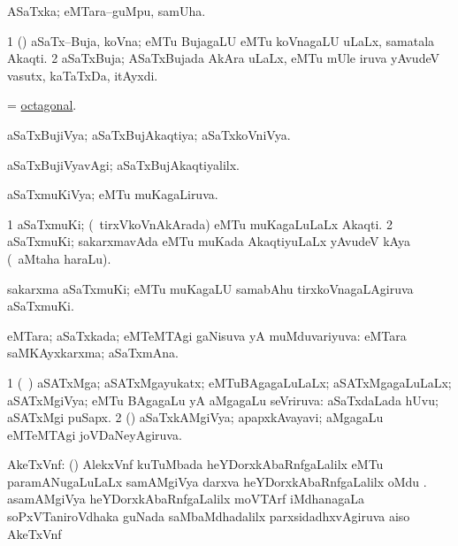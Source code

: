 \bentry
{}
\gl{\nA}
\bmng
ASaTxka; eMTara--guMpu, samUha. 
\emng
\eentry

\bentry
{}
\gl{\nA}
\bmng
\bnum
\num{1} (\jAyx) aSaTx--Buja, koVna; eMTu BujagaLU eMTu koVnagaLU uLaLx, samatala Akaqti.  
\num{2} aSaTxBuja; ASaTxBujada AkAra uLaLx, eMTu mUle iruva yAvudeV vasutx, kaTaTxDa, itAyxdi. 
\enum
\emng
\eentry

\bentry
{}
\gl{\gu}
\bmng
= \hyperlink{octagonal}{octagonal}. 
\emng
\eentry

\bentry
{}
\gl{\gu}
\bmng
aSaTxBujiVya; aSaTxBujAkaqtiya; aSaTxkoVniVya. 
\emng
\eentry

\bentry
{}
\gl{\kirxvi}
\bmng
aSaTxBujiVyavAgi; aSaTxBujAkaqtiyalilx. 
\emng
\eentry

\bentry
{}
\gl{\gu}
\bmng
aSaTxmuKiVya; eMTu muKagaLiruva. 
\emng
\eentry

\bentry
{}
\gl{\nA}
\bmng
\bnum
\num{1} aSaTxmuKi; (\kanmu\ tirxVkoVnAkArada) eMTu muKagaLuLaLx Akaqti. 
\num{2} aSaTxmuKi; sakarxmavAda eMTu muKada AkaqtiyuLaLx yAvudeV kAya (\kanmu\ aMtaha haraLu). 
\enum
\emng

\noindent
\gl{\pagu}
\bmng
{} sakarxma aSaTxmuKi; eMTu muKagaLU samabAhu tirxkoVnagaLAgiruva aSaTxmuKi. 
\emng
\eentry

\bentry
{}
\gl{\gu}
\bmng
eMTara; aSaTxkada; eMTeMTAgi gaNisuva yA muMduvariyuva:  eMTara saMKAyxkarxma; aSaTxmAna. 
\emng
\eentry

\bentry
{}
\gl{\gu}
\bmng
\bnum
\num{1} (\kanmu\ \savi) aSATxMga; aSATxMgayukatx; eMTuBAgagaLuLaLx; aSATxMgagaLuLaLx; aSATxMgiVya; eMTu BAgagaLu yA aMgagaLu seVriruva:  aSaTxdaLada hUvu; aSATxMgi puSapx. 
\num{2} (\pArxvi) aSaTxkAMgiVya; apapxkAvayavi; aMgagaLu eMTeMTAgi joVDaNeyAgiruva. 
\enum
\emng
\eentry

\bentry
{}
\gl{\nA}
\bmng
AkeTxVnf: 
\banum
{} (\ravi) AlekxVnf kuTuMbada heYDorxkAbaRnfgaLalilx eMTu paramANugaLuLaLx samAMgiVya darxva heYDorxkAbaRnfgaLalilx oMdu . 
 asamAMgiVya heYDorxkAbaRnfgaLalilx moVTArf iMdhanagaLa soPxVTaniroVdhaka guNada saMbaMdhadalilx parxsidadhxvAgiruva aiso AkeTxVnf  
\eanum
\emng

